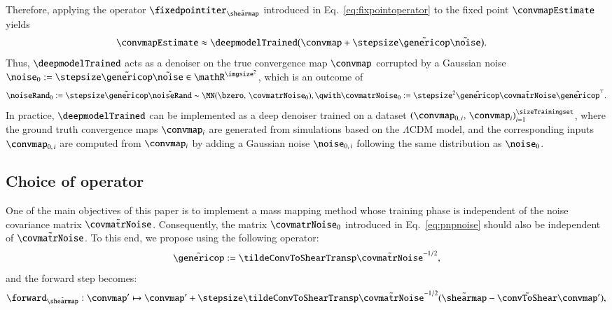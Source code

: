 \documentclass{aa}
\begin{document}
Therefore, applying the operator $\fixedpointiter_{\tilde\shearmap}$ introduced in Eq.~\eqref{eq:fixpointoperator} to the fixed point $\convmapEstimate$ yields
\begin{align}
    \convmapEstimate
        &\approx \deepmodelTrained\bigl(
            \convmap + \stepsize\tilde\genericop\tilde\noise
        \bigr).
\end{align}
Thus, $\deepmodelTrained$ acts as a denoiser on the true convergence map $\convmap$ corrupted by a Gaussian noise $\noise_0 := \stepsize\tilde\genericop\tilde\noise \in \mathR^{\imgsize^2}$, which is an outcome of
\begin{equation}
    \noiseRand_0 := \stepsize\tilde\genericop\tilde\noiseRand \sim \MN(\bzero,\, \covmatrNoise_0),\qwith \covmatrNoise_0 := \stepsize^2\tilde\genericop\tilde\covmatrNoise\tilde\genericop^\top.
\label{eq:pnpnoise}
\end{equation}
In practice, $\deepmodelTrained$ can be implemented as a deep denoiser trained on a dataset $(\convmap_{0,\, i},\, \convmap_i)_{i=1}^{\sizeTrainingset}$, where the ground truth convergence maps $\convmap_i$ are generated from simulations based on the $\Lambda$CDM model, and the corresponding inputs $\convmap_{0,\, i}$ are computed from $\convmap_i$ by adding a Gaussian noise $\noise_{0,\, i}$ following the same distribution as $\noise_0$.


\subsection{Choice of operator}
\label{subsec:pnp_operator}

One of the main objectives of this paper is to implement a mass mapping method whose training phase is independent of the noise covariance matrix $\tilde\covmatrNoise$. Consequently, the matrix $\covmatrNoise_0$ introduced in Eq.~\eqref{eq:pnpnoise} should also be independent of $\tilde\covmatrNoise$.
To this end, we propose using the following operator:
\begin{equation}
    \tilde\genericop := \tildeConvToShearTransp\tilde\covmatrNoise^{-1/2},
\label{eq:genericop}
\end{equation}
and the forward step becomes:
\begin{equation}
    \forward_{\tilde\shearmap}: \convmap' \mapsto \convmap' + \stepsize\tildeConvToShearTransp\tilde\covmatrNoise^{-1/2}(\tilde\shearmap - \tilde\convToShear\convmap'),
\label{eq:forwardop2}
\end{equation}
\end{document}
